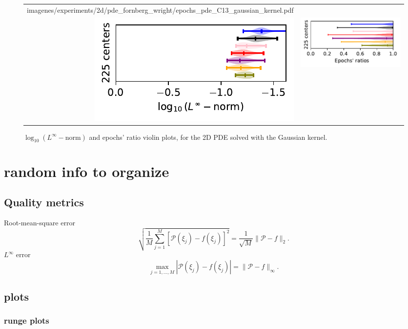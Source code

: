 \documentclass[12pt]{report} %
\begin{document}
\begin{figure}[h]
\begin{tabular}{rl}
{        {imagenes/experiments/2d/pde_fornberg_wright/epochs_pde_C13_gaussian_kernel.pdf}}
    \\
    {\includegraphics[width=.5\textwidth, trim={0 0.2cm 0 0},clip=true]
    {imagenes/experiments/2d/pde_fornberg_wright/linf_pde_C15_gaussian_kernel.pdf}}
                                                                                                              & 
  {\includegraphics[width=.44\textwidth, trim={.7cm 0.2cm 0 0},clip=true]
        {imagenes/experiments/2d/pde_fornberg_wright/epochs_pde_C15_gaussian_kernel.pdf}}
  \end{tabular}
  \caption{$\log_{10}(L^\infty-\text{norm})$ and epochs' ratio violin plots, for the 2D PDE solved with the Gaussian kernel.}
  \label{fig:statistic-result-pde-gaussian-kernel}
\end{figure}

\chapter{random info to organize}
\section{Quality metrics}

Root-mean-square error
\[ \sqrt{\frac{1}{M} \sum_{j = 1}^M [\mathcal{P} (\xi_j) - f (\xi_j)]^2} =
  \frac{1}{\sqrt{M}} \| \mathcal{P}- f \|_2 . \]
$L^{\infty}$ error
\[ \max_{j = 1, \ldots, M} | \mathcal{P} (\xi_j) - f (\xi_j) | = \|
  \mathcal{P}- f \|_{\infty} . \]
  

\section{plots}
\subsection{runge plots}
\end{document}
